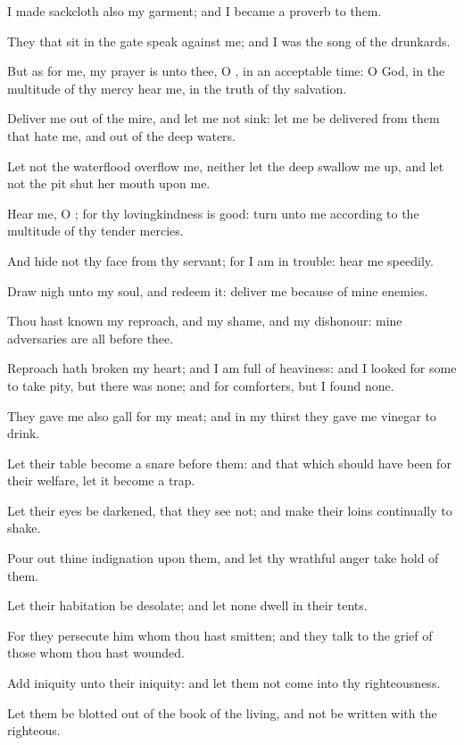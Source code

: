 \Verse I made sackcloth also my garment; and I became a proverb to them.

\Verse They that sit in the gate speak against me; and I was the song of the drunkards.

\Verse But as for me, my prayer is unto thee, O \LORD, in an acceptable time: O God, in the multitude of thy mercy hear me, in the truth of thy salvation.

\Verse Deliver me out of the mire, and let me not sink: let me be delivered from them that hate me, and out of the deep waters.

\Verse Let not the waterflood overflow me, neither let the deep swallow me up, and let not the pit shut her mouth upon me.

\Verse Hear me, O \LORD; for thy lovingkindness is good: turn unto me according to the multitude of thy tender mercies.

\Verse And hide not thy face from thy servant; for I am in trouble: hear me speedily.

\Verse Draw nigh unto my soul, and redeem it: deliver me because of mine enemies.

\Verse Thou hast known my reproach, and my shame, and my dishonour: mine adversaries are all before thee.

\Verse Reproach hath broken my heart; and I am full of heaviness: and I looked for some to take pity, but there was none; and for comforters, but I found none.

\Verse They gave me also gall for my meat; and in my thirst they gave me vinegar to drink.

\Verse Let their table become a snare before them: and that which should have been for their welfare, let it become a trap.

\Verse Let their eyes be darkened, that they see not; and make their loins continually to shake.

\Verse Pour out thine indignation upon them, and let thy wrathful anger take hold of them.

\Verse Let their habitation be desolate; and let none dwell in their tents.

\Verse For they persecute him whom thou hast smitten; and they talk to the grief of those whom thou hast wounded.

\Verse Add iniquity unto their iniquity: and let them not come into thy righteousness.

\Verse Let them be blotted out of the book of the living, and not be written with the righteous.

